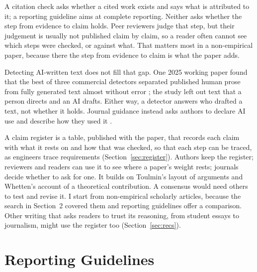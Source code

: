 \documentclass[12pt, a4paper]{article}
\begin{document}
A citation check asks whether a cited work exists and says what is
attributed to it; a reporting guideline aims at complete reporting.
Neither asks whether the step from evidence to claim holds.  Peer
reviewers judge that step, but their judgement is usually not published
claim by claim, so a reader often cannot see which steps were checked, or against
what.  That matters most in a non-empirical paper, because there the step from evidence to claim is what the paper adds.

Detecting AI-written text does not fill that gap.  One 2025 working paper found that the best of three commercial detectors separated published human prose from fully generated text almost without error
\citep{jabarian2025}; the study left out text that a person directs and
an AI drafts.  Either way, a detector answers who drafted a text, not
whether it holds.  Journal guidance instead asks authors to declare AI use and describe how they used it \citep{icmje2026}.

A claim register is a table, published with the paper, that records each claim
with what it rests on and how that was checked, so that each step can
be traced, as engineers trace requirements (Section~\ref{sec:register}).  Authors keep the
register; reviewers and readers can use it to see where a paper's weight
rests; journals decide whether to ask for one.  It builds on Toulmin's
layout of arguments and Whetten's account of a theoretical
contribution.  A consensus would need
others to test and revise it.  I start from non-empirical scholarly
articles, because the search in Section~2 covered
them and reporting guidelines offer a comparison.  Other writing that
asks readers to trust its reasoning, from student essays to journalism,
might use the register too (Section~\ref{sec:recs}).

\section{Reporting Guidelines}
\end{document}
